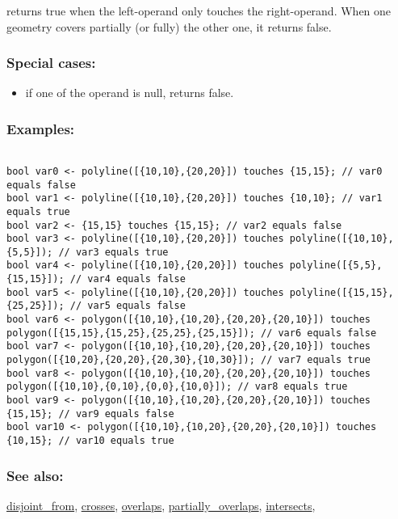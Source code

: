 \documentclass[]{book}
\providecommand{\tightlist}{%
  \setlength{\itemsep}{0pt}\setlength{\parskip}{0pt}}
\theoremstyle{definition}
\theoremstyle{definition}
\theoremstyle{definition}
\theoremstyle{remark}
\begin{document}
returns true when the left-operand only touches the right-operand. When
one geometry covers partially (or fully) the other one, it returns
false.

\subsubsection{Special cases:}\label{special-cases-139}

\begin{itemize}
\tightlist
\item
  if one of the operand is null, returns false.
\end{itemize}

\subsubsection{Examples:}\label{examples-364}

\begin{verbatim}
 
bool var0 <- polyline([{10,10},{20,20}]) touches {15,15}; // var0 equals false 
bool var1 <- polyline([{10,10},{20,20}]) touches {10,10}; // var1 equals true 
bool var2 <- {15,15} touches {15,15}; // var2 equals false 
bool var3 <- polyline([{10,10},{20,20}]) touches polyline([{10,10},{5,5}]); // var3 equals true 
bool var4 <- polyline([{10,10},{20,20}]) touches polyline([{5,5},{15,15}]); // var4 equals false 
bool var5 <- polyline([{10,10},{20,20}]) touches polyline([{15,15},{25,25}]); // var5 equals false 
bool var6 <- polygon([{10,10},{10,20},{20,20},{20,10}]) touches polygon([{15,15},{15,25},{25,25},{25,15}]); // var6 equals false 
bool var7 <- polygon([{10,10},{10,20},{20,20},{20,10}]) touches polygon([{10,20},{20,20},{20,30},{10,30}]); // var7 equals true 
bool var8 <- polygon([{10,10},{10,20},{20,20},{20,10}]) touches polygon([{10,10},{0,10},{0,0},{10,0}]); // var8 equals true 
bool var9 <- polygon([{10,10},{10,20},{20,20},{20,10}]) touches {15,15}; // var9 equals false 
bool var10 <- polygon([{10,10},{10,20},{20,20},{20,10}]) touches {10,15}; // var10 equals true
\end{verbatim}

\subsubsection{See also:}\label{see-also-207}

\href{OperatorsDH\#disjoint_from}{disjoint\_from},
\href{OperatorsBC\#crosses}{crosses},
\href{OperatorsNR\#overlaps}{overlaps},
\href{OperatorsNR\#partially_overlaps}{partially\_overlaps},
\href{OperatorsIM\#intersects}{intersects},
\end{document}
